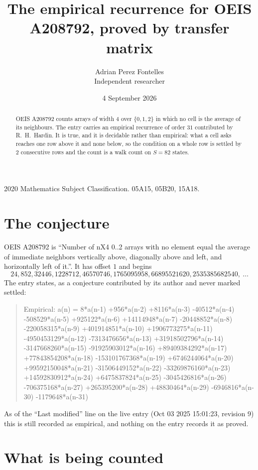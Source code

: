\documentclass[11pt,a4paper]{article}
\title{The empirical recurrence for OEIS A208792, proved by transfer matrix}
\author{Adrian Perez Fontelles\\ \small Independent researcher}
\date{4 September 2026}
\theoremstyle{plain}
\theoremstyle{definition}
\begin{document}
\maketitle

\begin{abstract}
OEIS A208792 counts arrays of width $4$ over $\{0,1,2\}$ in which no cell is the average of its neighbours. The entry carries an
empirical recurrence of order $31$ contributed by R.~H.~Hardin. It is true, and it is
decidable rather than empirical: what a cell asks reaches one row above
it and none below, so the condition on a whole row is settled by
$2$ consecutive rows and the count is a walk count on $S=82$ states.
\end{abstract}

\noindent\small 2020 Mathematics Subject Classification. 05A15, 05B20, 15A18.\normalsize

\section{The conjecture}

OEIS A208792 is ``Number of nX4 0..2 arrays with no element equal the average of immediate neighbors vertically above, diagonally above and left, and horizontally left of it.''. It has offset $1$ and begins
\[
24, 852, 32446, 1228712, 46570746, 1765095958, 66895521620, 2535385682540,\ \dots
\]
The entry states, as a conjecture contributed by its author and never marked settled:
\begin{quote}
Empirical: a(n) = 8*a(n-1) +956*a(n-2) +8116*a(n-3) -40512*a(n-4) -508529*a(n-5) +925122*a(n-6) +14114948*a(n-7) -20448852*a(n-8) -220058315*a(n-9) +401914851*a(n-10) +1906773275*a(n-11) -4950453129*a(n-12) -7313476656*a(n-13) +31918502796*a(n-14) -3147668260*a(n-15) -91925903012*a(n-16) +89409384292*a(n-17) +77843854208*a(n-18) -153101767368*a(n-19) +6746244064*a(n-20) +99592150048*a(n-21) -31506449152*a(n-22) -33269876160*a(n-23) +14592830912*a(n-24) +6475837824*a(n-25) -3045426816*a(n-26) -706375168*a(n-27) +265395200*a(n-28) +48830464*a(n-29) -6946816*a(n-30) -1179648*a(n-31)
\end{quote}
As of the ``Last modified'' line on the live entry (Oct 03 2025 15:01:23, revision 9) this is still
recorded as empirical, and nothing on the entry records it as proved.

\section{What is being counted}
\end{document}
